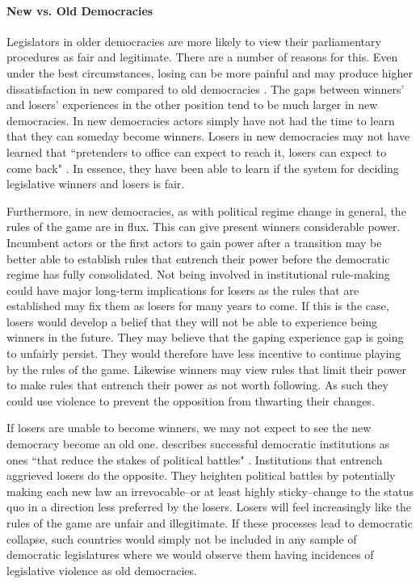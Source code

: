 \documentclass[a4paper]{article}\usepackage{graphicx, color}
\begin{document}
\paragraph{New vs. Old Democracies}

Legislators in older democracies are more likely to view their parliamentary procedures as fair and legitimate. There are a number of reasons for this. Even under the best circumstances, losing can be more painful and may produce higher dissatisfaction in new compared to old democracies \citep{Anderson2005}. The gaps between winners' and losers' experiences in the other position tend to be much larger in new democracies. In new democracies actors simply have not had the time to learn that they can someday become winners. Losers in new democracies may not have learned that ``pretenders to office can expect to reach it, losers can expect to come back" \citep[][36]{Przeworski1991}. In essence, they have been able to learn if the system for deciding legislative winners and losers is fair. 

Furthermore, in new democracies, as with political regime change in general, the rules of the game are in flux. This can give present winners considerable power. Incumbent actors or the first actors to gain power after a transition may be better able to establish rules that entrench their power \cite[108]{Saideman2002} before the democratic regime has fully consolidated. Not being involved in institutional rule-making could have major long-term implications for losers as the rules that are established may fix them as losers for many years to come. If this is the case, losers would develop a belief that they will not be able to experience being winners in the future. They may believe that the gaping experience gap is going to unfairly persist. They would therefore have less incentive to continue playing by the rules of the game. Likewise winners may view rules that limit their power to make rules that entrench their power as not worth following. As such they could use violence to prevent the opposition from thwarting their changes. 

If losers are unable to become winners, we may not expect to see the new democracy become an old one. \citeauthor{Przeworski1991} describes successful democratic institutions as ones ``that reduce the stakes of political battles" \citeyearpar[][36]{Przeworski1991}. Institutions that entrench aggrieved losers do the opposite. They heighten political battles by potentially making each new law an irrevocable--or at least highly sticky--change to the status quo in a direction less preferred by the losers. Losers will feel increasingly like the rules of the game are unfair and illegitimate. If these processes lead to democratic collapse, such countries would simply not be included in any sample of democratic legislatures where we would observe them having incidences of legislative violence as old democracies.
\end{document}

